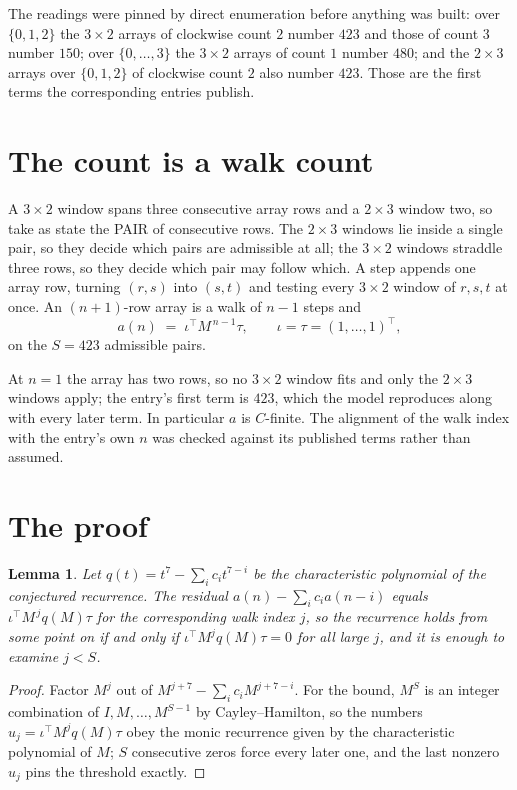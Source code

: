 \documentclass[11pt,a4paper]{article}
\theoremstyle{plain}
\newtheorem{lemma}[theorem]{Lemma}
\theoremstyle{definition}
\begin{document}
The readings were pinned by direct enumeration before anything was built: over
$\{0,1,2\}$ the $3\times2$ arrays of clockwise count $2$ number $423$ and those of count
$3$ number $150$; over $\{0,\dots,3\}$ the $3\times2$ arrays of count $1$ number $480$;
and the $2\times3$ arrays over $\{0,1,2\}$ of clockwise count $2$ also number $423$. Those
are the first terms the corresponding entries publish.

\section{The count is a walk count}

A $3\times2$ window spans three consecutive array rows and a $2\times3$
window two, so take as state the PAIR of consecutive rows. The $2\times3$ windows lie inside a
single pair, so they decide which pairs are admissible at all; the $3\times2$ windows straddle
three rows, so they decide which pair may follow which. A step appends one array row, turning
$(r,s)$ into $(s,t)$ and testing every $3\times2$ window of $r,s,t$ at once. An $(n+1)$-row
array is a walk of $n-1$ steps and
\[
a(n)\;=\;\iota^{\!\top}M^{\,n-1}\tau,\qquad\iota=\tau=(1,\dots,1)^{\!\top},
\]
on the $S=423$ admissible pairs.

At $n=1$ the array has two rows, so no $3\times2$ window fits and only the
$2\times3$ windows apply; the entry's first term is
$423$, which the model reproduces along with every later term.
In particular $a$ is $C$-finite. The alignment of the walk index with the entry's own $n$ was
checked against its published terms rather than assumed.

\section{The proof}

\begin{lemma}\label{lem:crit}
Let $q(t)=t^{7}-\sum_i c_it^{7-i}$ be the characteristic polynomial of the
conjectured recurrence. The residual $a(n)-\sum_ic_ia(n-i)$ equals
$\iota^{\!\top}M^{\,j}q(M)\tau$ for the corresponding walk index $j$, so the recurrence
holds from some point on if and only if $\iota^{\!\top}M^{j}q(M)\tau=0$ for all large $j$,
and it is enough to examine $j<S$.
\end{lemma}

\begin{proof}
Factor $M^{j}$ out of $M^{j+7}-\sum_ic_iM^{j+7-i}$. For the bound, $M^{S}$
is an integer combination of $I,M,\dots,M^{S-1}$ by Cayley--Hamilton, so the numbers
$u_j=\iota^{\!\top}M^{j}q(M)\tau$ obey the monic recurrence given by the characteristic
polynomial of $M$; $S$ consecutive zeros force every later one, and the last nonzero $u_j$
pins the threshold exactly.
\end{proof}
\end{document}
